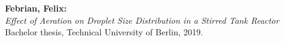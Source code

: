 \newpage


\thispagestyle{empty}                   %

\vspace*{\fill}

\footnotesize
\noindent
\textbf{Febrian, Felix:} \\
\textit{Effect of Aeration on Droplet Size Distribution in a Stirred Tank Reactor} \\
Bachelor thesis, Technical University of Berlin, 2019.
\restoregeometry
\normalsize